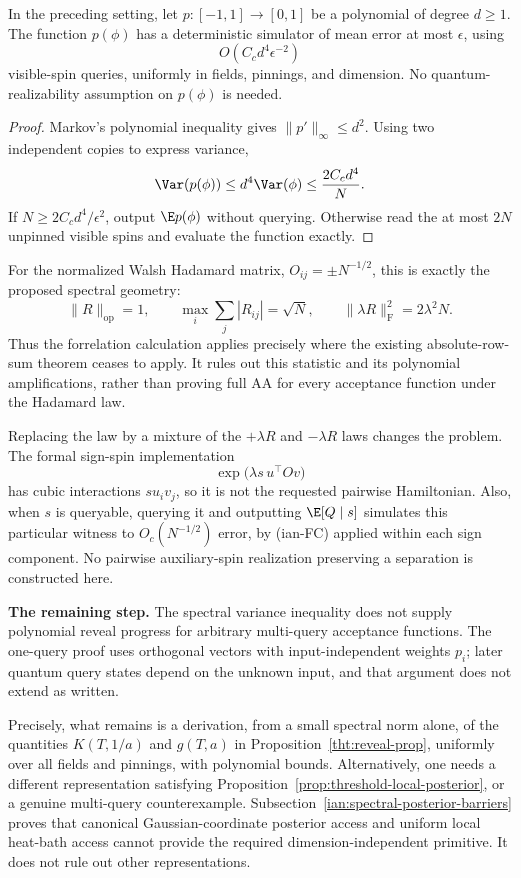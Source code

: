 \begin{corollary}
\label{ian:hadamard-polynomial-simulation}
In the preceding setting, let \(p:[-1,1]\to[0,1]\) be a polynomial of
degree \(d\ge1\). The function \(p(\phi)\) has a deterministic simulator
of mean error at most \(\epsilon\), using
\[
 O(C_c d^4\epsilon^{-2})
\]
visible-spin queries, uniformly in fields, pinnings, and dimension.
No quantum-realizability assumption on \(p(\phi)\) is needed.
\end{corollary}

\begin{proof}
Markov's polynomial inequality gives \(\|p'\|_\infty\le d^2\).
Using two independent copies to express variance,
\[
 \Var(p(\phi))\le d^4\Var(\phi)\le\frac{2C_cd^4}{N}.
\]
If \(N\ge2C_cd^4/\epsilon^2\), output \(\E p(\phi)\) without querying.
Otherwise read the at most \(2N\) unpinned visible spins and evaluate the
function exactly.
\end{proof}

For the normalized Walsh Hadamard matrix, \(O_{ij}=\pm N^{-1/2}\),
this is exactly the proposed spectral geometry:
\[
 \|R\|_{\mathrm{op}}=1,\qquad
 \max_i\sum_j|R_{ij}|=\sqrt N,\qquad
 \|\lambda R\|_{\mathrm F}^2=2\lambda^2N.
\]
Thus the forrelation calculation applies precisely where the existing
absolute-row-sum theorem ceases to apply. It rules out this statistic
and its polynomial amplifications, rather than proving full AA for
every acceptance function under the Hadamard law.

Replacing the law by a mixture of the \(+\lambda R\) and
\(-\lambda R\) laws changes the problem. The formal sign-spin
implementation
\[
 \exp\bigl(\lambda s\,u^\top Ov\bigr)
\]
has cubic interactions \(s u_i v_j\), so it is not the requested
pairwise Hamiltonian. Also, when \(s\) is queryable, querying it and
outputting \(\E[Q\mid s]\) simulates this particular witness to
\(O_c(N^{-1/2})\) error, by (ian-FC) applied within each sign component.
No pairwise auxiliary-spin realization preserving a separation is
constructed here.

\textbf{The remaining step.}
The spectral variance inequality does not supply polynomial reveal
progress for arbitrary multi-query acceptance functions. The one-query
proof uses orthogonal vectors with input-independent weights \(p_i\);
later quantum query states depend on the unknown input, and that
argument does not extend as written.

Precisely, what remains is a derivation, from a small spectral norm
alone, of the quantities \(K(T,1/a)\) and \(g(T,a)\) in
Proposition~\ref{tht:reveal-prop}, uniformly over all fields and pinnings,
with polynomial bounds. Alternatively, one needs a different
representation satisfying
Proposition~\ref{prop:threshold-local-posterior}, or a genuine
multi-query counterexample. Subsection~\ref{ian:spectral-posterior-barriers} proves that canonical
Gaussian-coordinate posterior access and uniform local heat-bath
access cannot provide the required dimension-independent primitive.
It does not rule out other representations.
